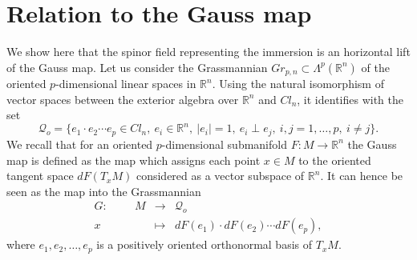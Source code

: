 \documentclass{amsart}
\begin{document}
\section{Relation to the Gauss map}
We show here that the spinor field representing the immersion is an horizontal lift of the Gauss map.  Let us consider the Grassmannian $Gr_{p,n}\subset \Lambda^p(\mathbb{R}^n)$ of the oriented $p$-dimensional linear spaces in ${\mathbb{R}}^n$. Using the natural isomorphism of vector spaces between the exterior algebra over $\mathbb{R}^n$ and $Cl_n$, it identifies with the set
$$\mathcal{Q}_o=\{e_{1}\cdot e_2\cdots e_p\in Cl_n,\ e_i\in{\mathbb{R}}^n,\ |e_i|=1,\ e_i\perp e_j,\ i,j=1,\ldots,p,\ i\neq j\}.$$
We recall that for an oriented $p$-dimensional submanifold $F:M\rightarrow\mathbb{R}^n$ the Gauss map is defined as the map which assigns each point $x\in M$ to the oriented tangent space $dF(T_xM)$ considered as a vector subspace of $\mathbb{R}^n$. It can hence be seen as the map into the Grassmannian
\begin{eqnarray*}
G:\hspace{1cm} M&\rightarrow& \mathcal{Q}_o\\
x&\mapsto& dF(e_{1})\cdot dF(e_2)\cdots dF(e_p),
\end{eqnarray*} 
where $e_{1},e_2,\ldots,e_p$ is a positively oriented orthonormal basis of $T_xM.$ 
\end{document}

